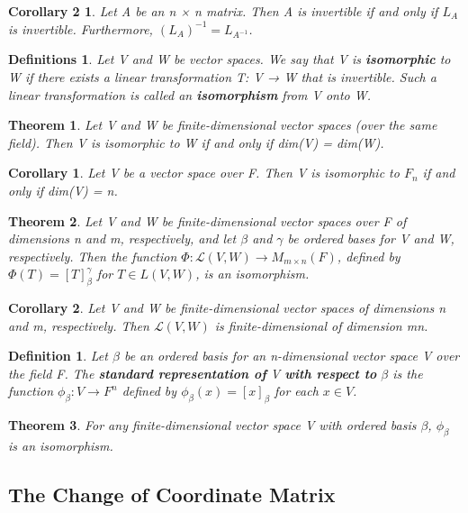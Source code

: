 \documentclass{article}
\newcommand{\bd}[1]{\textbf{#1}}
\theoremstyle{plain}
\newtheorem{theorem}{Theorem}[section]
\newtheorem*{corollary}{Corollary}
\newtheorem*{corollary2}{Corollary 2}
\newtheorem*{definition1}{Definition}
\newtheorem*{definitions}{Definitions}
\theoremstyle{plain} %
\begin{document}
\begin{corollary2}
Let A be an n × n matrix. Then A is invertible if and only if $L_A$ is invertible. Furthermore, $(L_A)^{-1} = L_{A^{-1}}$.
\end{corollary2}

\begin{definitions}
Let V and W be vector spaces. We say that V is \bd{isomorphic} to W if there exists a linear transformation T: V → W that is invertible. Such a linear transformation is called an \bd{isomorphism} from V onto W.
\end{definitions}

\begin{theorem}
Let V and W be finite-dimensional vector spaces (over the same field). Then V is isomorphic to W if and only if dim(V) = dim(W).
\end{theorem}

\begin{corollary}
Let V be a vector space over F. Then V is isomorphic to $F_n$ if and only if dim(V) = n.
\end{corollary}

\begin{theorem}
Let V and W be finite-dimensional vector spaces over F of dimensions n and m, respectively, and let $\beta$ and $\gamma$ be ordered bases for V and W, respectively. Then the function $\Phi: \mathcal L(V, W) → M_{m\times n}(F)$, defined by $\Phi(T)=[T]_\beta^\gamma$ for $T \in L(V, W)$, is an isomorphism.
\end{theorem}

\begin{corollary}
Let V and W be finite-dimensional vector spaces of dimensions n and m, respectively. Then $\mathcal L(V, W)$ is finite-dimensional of dimension mn.
\end{corollary}

\begin{definition1}
Let $\beta$ be an ordered basis for an n-dimensional vector space V over the field F. The \bd{standard representation of} V \bd{with respect to} $\beta$ is the function $\phi_\beta : V \to F^n$ defined by $\phi_\beta(x)=[x]_\beta$ for each $x \in V$.
\end{definition1}

\begin{theorem}
For any finite-dimensional vector space V with ordered basis $\beta$, $\phi_\beta$ is an isomorphism.
\end{theorem}

\subsection{The Change of Coordinate Matrix}
\end{document}

